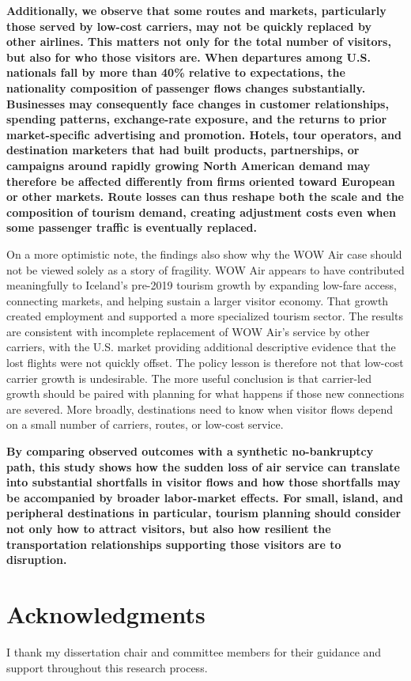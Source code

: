 \documentclass[12pt]{article}
\begin{document}
\textbf{Additionally, we observe that some routes and markets, particularly those served by low-cost carriers, may not be quickly replaced by other airlines. This matters not only for the total number of visitors, but also for who those visitors are. When departures among U.S. nationals fall by more than 40\% relative to expectations, the nationality composition of passenger flows changes substantially. Businesses may consequently face changes in customer relationships, spending patterns, exchange-rate exposure, and the returns to prior market-specific advertising and promotion. Hotels, tour operators, and destination marketers that had built products, partnerships, or campaigns around rapidly growing North American demand may therefore be affected differently from firms oriented toward European or other markets. Route losses can thus reshape both the scale and the composition of tourism demand, creating adjustment costs even when some passenger traffic is eventually replaced.
}

On a more optimistic note, the findings also show why the WOW Air case should not be viewed solely as a story of fragility. WOW Air appears to have contributed meaningfully to Iceland's pre-2019 tourism growth by expanding low-fare access, connecting markets, and helping sustain a larger visitor economy. That growth created employment and supported a more specialized tourism sector. The results are consistent with incomplete replacement of WOW Air’s service by other carriers, with the U.S. market providing additional descriptive evidence that the lost flights were not quickly offset. The policy lesson is therefore not that low-cost carrier growth is undesirable. The more useful conclusion is that carrier-led growth should be paired with planning for what happens if those new connections are severed. More broadly, destinations need to know when visitor flows depend on a small number of carriers, routes, or low-cost service.

\textbf{By comparing observed outcomes with a synthetic no-bankruptcy path, this study shows how the sudden loss of air service can translate into substantial shortfalls in visitor flows and how those shortfalls may be accompanied by broader labor-market effects. For small, island, and peripheral destinations in particular, tourism planning should consider not only how to attract visitors, but also how resilient the transportation relationships supporting those visitors are to disruption.}

\section*{Acknowledgments}
I thank my dissertation chair and committee members for their guidance and support throughout this research process.
\end{document}
